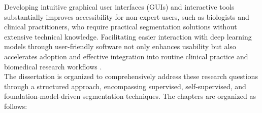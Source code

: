 \documentclass[./dissertation.tex]{subfiles}
\begin{document}
Developing intuitive graphical user interfaces (GUIs) and interactive tools substantially improves accessibility for non-expert users, such as biologists and clinical practitioners, who require practical segmentation solutions without extensive technical knowledge. Facilitating easier interaction with deep learning models through user-friendly software not only enhances usability but also accelerates adoption and effective integration into routine clinical practice and biomedical research workflows \cite{sofroniew2022napari}. \\


The dissertation is organized to comprehensively address these research questions through a structured approach, encompassing supervised, self-supervised, and foundation-model-driven segmentation techniques. The chapters are organized as follows:
\end{document}
